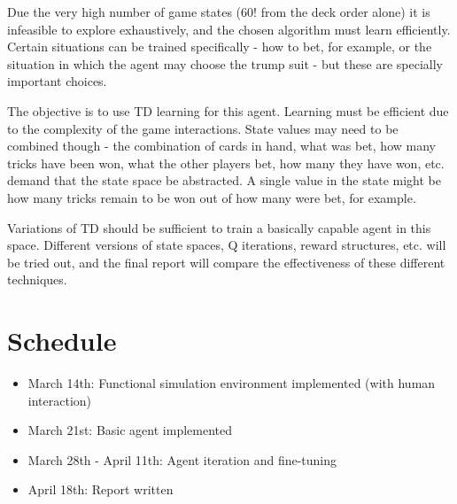 \documentclass[10pt]{article} %
\begin{document}
Due the very high number of game states ($60!$ from the deck order alone) it is infeasible to explore exhaustively, and the chosen algorithm must learn efficiently. Certain situations can be trained specifically - how to bet, for example, or the situation in which the agent may choose the trump suit - but these are specially important choices.

The objective is to use TD learning for this agent. Learning must be efficient due to the complexity of the game interactions. State values may need to be combined though - the combination of cards in hand, what was bet, how many tricks have been won, what the other players bet, how many they have won, etc. demand that the state space be abstracted. A single value in the state might be how many tricks remain to be won out of how many were bet, for example.

Variations of TD should be sufficient to train a basically capable agent in this space. Different versions of state spaces, Q iterations, reward structures, etc. will be tried out, and the final report will compare the effectiveness of these different techniques.

\section{Schedule}

\begin{itemize}
\item March 14th: Functional simulation environment implemented (with human interaction)
\item March 21st: Basic agent implemented
\item March 28th - April 11th: Agent iteration and fine-tuning
\item April 18th: Report written
\end{itemize}
\end{document}
